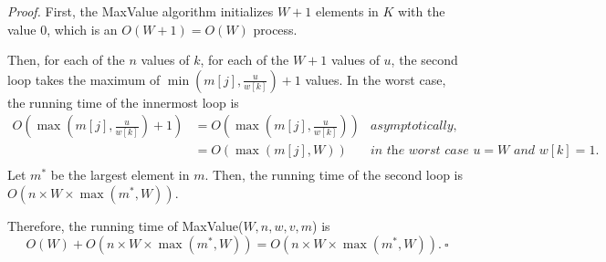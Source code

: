 \begin{enumerate}
\begin{solution}
\textit{Proof. }First, the {\sc MaxValue} algorithm initializes $W+1$ elements in $K$ with the value $0$, which is an $O(W+1)=O(W)$ process.

Then, for each of the $n$ values of $k$, for each of the $W+1$ values of $u$, the second loop takes the maximum of $\min\left(m[j],\frac{u}{w[k]}\right)+1$ values. In the worst case, the running time of the innermost loop is
\begin{align*}
O\left(\max\left(m[j],\frac{u}{w[k]}\right)+1\right)
&=O\left(\max\left(m[j],\frac{u}{w[k]}\right)\right)&\textit{asymptotically,}\\
&=O(\max(m[j],W))&\textit{in the worst case $u=W$ and $w[k]=1$.}\\
\end{align*}
Let $m^*$ be the largest element in $m$. Then, the running time of the second loop is $O(n\times W\times\max(m^*,W))$.

Therefore, the running time of {\sc MaxValue}($W,n,w,v,m$) is \[O(W)+O(n\times W\times\max(m^*,W))=O(n\times W\times\max(m^*,W)).~\square\]
\end{solution}
\end{enumerate}
\newpage

